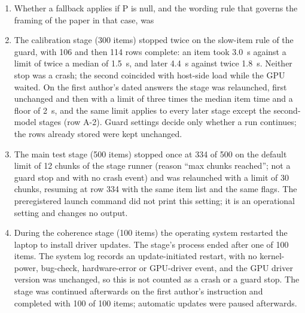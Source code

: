 \begin{enumerate}
with S2 partial is then possible.
\item Whether a fallback applies if P is null, and the wording rule that governs the framing of the paper in that case, was
\item The calibration stage (300 items) stopped twice on the slow-item rule of the guard, with 106 and then 114 rows complete: an item
took 3.0~s against a limit of twice a median of 1.5~s, and later 4.4~s against twice 1.8~s. Neither stop was a crash; the second coincided
with host-side load while the GPU waited. On the first author's dated answers the stage was relaunched, first unchanged and then with a
limit of three times the median item time and a floor of 2~s, and the same limit applies to every later stage except the second-model
stages (row A-2). Guard settings decide only whether a run continues; the rows already stored were kept unchanged.
\item The main test stage (500 items) stopped once at 334 of 500 on the default limit of 12 chunks of the stage runner (reason ``max
chunks reached''; not a guard stop and with no crash event) and was relaunched with a limit of 30 chunks, resuming at row 334 with the
same item list and the same flags. The preregistered launch command did not print this setting; it is an operational setting and changes
no output.
\item During the coherence stage (100 items) the operating system restarted the laptop to install driver updates. The stage's process
ended after one of 100 items. The system log records an update-initiated restart, with no kernel-power, bug-check, hardware-error or GPU-driver
event, and the GPU driver version was unchanged, so this is not counted as a crash or a guard stop. The stage was continued afterwards on
the first author's instruction and completed with 100 of 100 items; automatic updates were paused afterwards.

\end{enumerate}
